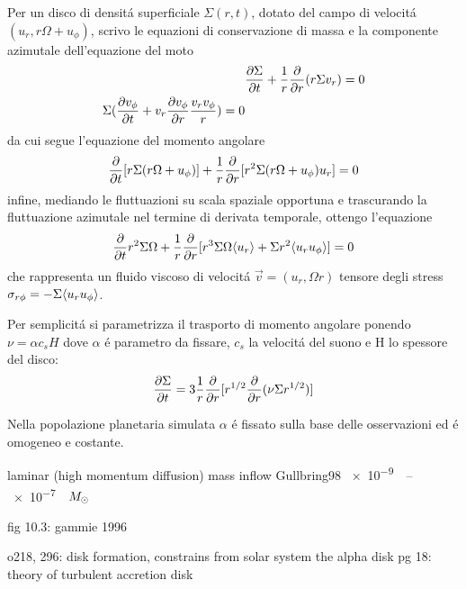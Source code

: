 Per un disco di densit\'a superficiale $\Sigma(r,t)$, dotato del campo di velocit\'a $(u_r,r\Omega+u_{\phi})$, scrivo le equazioni di conservazione di massa e la componente azimutale dell'equazione del moto
\begin{align}
&\PDy{t}{\Sigma}+\frac{1}{r}\PDof{r}(r\Sigma v_r)=0\\
\Sigma(\PDy{t}{v_{\phi}}+v_r\PDy{r}{v_{\phi}}\frac{v_rv_{\phi}}{r})=0
\end{align}
da cui segue l'equazione del momento angolare
\begin{equation}
\PDof{t}[r\Sigma(r\Omega+u_{\phi})]+\frac{1}{r}\PDof{r}[r^2\Sigma(r\Omega+u_{\phi})u_r]=0
\end{equation}
infine, mediando le fluttuazioni su scala spaziale opportuna e trascurando la fluttuazione azimutale nel termine di derivata temporale, ottengo l'equazione
\begin{equation}
\PDof{t}r^2\Sigma\Omega+\frac{1}{r}\PDof{r}[r^3\Sigma\Omega\exv{u_r}+\Sigma r^2\exv{u_ru_{\phi}}]=0
\end{equation}
che rappresenta un fluido viscoso di velocit\'a $\vec{v}=(u_r,\Omega r)$ tensore degli stress $\sigma_{r\phi}=-\Sigma\exv{u_ru_{\phi}}$.

Per semplicit\'a si parametrizza il trasporto di momento angolare ponendo $\nu=\alpha c_s H$ dove $\alpha$ \'e parametro da fissare, $c_s$ la velocit\'a del suono e H lo spessore del disco:
\begin{equation}
\PDy{t}{\Sigma}=3\frac{1}{r}\PDof{r}[r\expy{1/2}\PDof{r}(\nu\Sigma r\expy{1/2})]\label{eq:sigmaevol}
\end{equation}

Nella popolazione planetaria simulata $\alpha$ \'e fissato sulla base delle osservazioni  ed \'e omogeneo e costante.

\begin{workout}
laminar (high momentum diffusion)
mass inflow Gullbring98 \SIrange{e-9}{e-7}{\per\year}$\msun{}$
\end{workout}


\begin{workout}[MRI]
fig 10.3:
gammie 1996
\end{workout}


\begin{workout}
o218, 296: disk formation, constrains from solar system
the alpha disk pg 18: theory of turbulent accretion disk
\end{workout}

